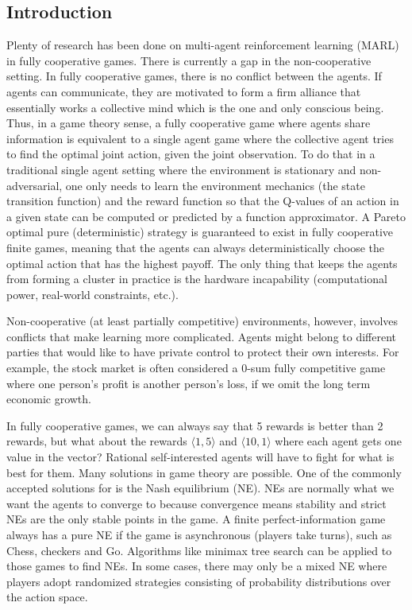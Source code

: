 \documentclass[a4paper]{article}
\begin{document}
\begin{multicols}{2}
\setlength{\columnsep}{0.5cm}

\section{Introduction}
Plenty of research has been done on multi-agent reinforcement learning (MARL) in fully cooperative games. There is currently a gap in the non-cooperative setting. In fully cooperative games, there is no conflict between the agents. If agents can communicate, they are motivated to form a firm alliance that essentially works a collective mind which is the one and only conscious being. Thus, in a game theory sense, a fully cooperative game where agents share information is equivalent to a single agent game where the collective agent tries to find the optimal joint action, given the joint observation. To do that in a traditional single agent setting where the environment is stationary and non-adversarial, one only needs to learn the environment mechanics (the state transition function) and the reward function so that the Q-values of an action in a given state can be computed or predicted by a function approximator. A Pareto optimal pure (deterministic) strategy is guaranteed to exist in fully cooperative finite games, meaning that the agents can always deterministically choose the optimal action that has the highest payoff. The only thing that keeps the agents from forming a cluster in practice is the hardware incapability (computational power, real-world constraints, etc.).

Non-cooperative (at least partially competitive) environments, however, involves conflicts that make learning more complicated. Agents might belong to different parties that would like to have private control to protect their own interests. For example, the stock market is often considered a 0-sum fully competitive game where one person's profit is another person's loss, if we omit the long term economic growth.

In fully cooperative games, we can always say that 5 rewards is better than 2 rewards, but what about the rewards $\langle 1,5 \rangle$ and  $\langle 10,1 \rangle$ where each agent gets one value in the vector? Rational self-interested agents will have to fight for what is best for them. Many solutions in game theory are possible. One of the commonly accepted solutions for is the Nash equilibrium (NE). NEs are normally what we want the agents to converge to because convergence means stability and strict NEs are the only stable points in the game. A finite perfect-information game always has a pure NE if the game is asynchronous (players take turns), such as Chess, checkers and Go. Algorithms like minimax tree search can be applied to those games to find NEs. In some cases, there may only be a mixed NE where players adopt randomized strategies consisting of probability distributions over the action space. 


\end{multicols}
\end{document}
